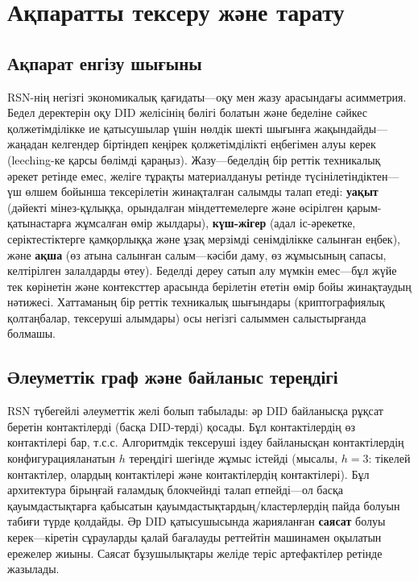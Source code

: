 \documentclass[11pt,a4paper,twocolumn]{article}
\begin{document}
\section{Ақпаратты тексеру және тарату}

\subsection{Ақпарат енгізу шығыны}

RSN-нің негізгі экономикалық қағидаты---оқу мен жазу арасындағы асимметрия. Бедел деректерін оқу DID желісінің бөлігі болатын және беделіне сәйкес қолжетімділікке ие қатысушылар үшін нөлдік шекті шығынға жақындайды---жаңадан келгендер біртіндеп кеңірек қолжетімділікті еңбегімен алуы керек (leeching-ке қарсы бөлімді қараңыз). Жазу---беделдің бір реттік техникалық әрекет ретінде емес, желіге тұрақты материалдануы ретінде түсінілетіндіктен---үш өлшем бойынша тексерілетін жинақталған салымды талап етеді: \textbf{уақыт} (дәйекті мінез-құлыққа, орындалған міндеттемелерге және өсірілген қарым-қатынастарға жұмсалған өмір жылдары), \textbf{күш-жігер} (адал іс-әрекетке, серіктестіктерге қамқорлыққа және ұзақ мерзімді сенімділікке салынған еңбек), және \textbf{ақша} (өз атына салынған салым---кәсіби даму, өз жұмысының сапасы, келтірілген залалдарды өтеу). Беделді дереу сатып алу мүмкін емес---бұл жүйе тек көрінетін және контексттер арасында берілетін ететін өмір бойы жинақтаудың нәтижесі. Хаттаманың бір реттік техникалық шығындары (криптографиялық қолтаңбалар, тексеруші алымдары) осы негізгі салыммен салыстырғанда болмашы.

\subsection{Әлеуметтік граф және байланыс тереңдігі}

RSN түбегейлі әлеуметтік желі болып табылады: әр DID байланысқа рұқсат беретін контактілерді (басқа DID-терді) қосады. Бұл контактілердің өз контактілері бар, т.с.с. Алгоритмдік тексеруші іздеу байланысқан контактілердің конфигурацияланатын $h$ тереңдігі шегінде жұмыс істейді (мысалы, $h=3$: тікелей контактілер, олардың контактілері және контактілердің контактілері). Бұл архитектура бірыңғай ғаламдық блокчейнді талап етпейді---ол басқа қауымдастықтарға қабысатын қауымдастықтардың/кластерлердің пайда болуын табиғи түрде қолдайды. Әр DID қатысушысында жарияланған \textbf{саясат} болуы керек---кіретін сұрауларды қалай бағалауды реттейтін машинамен оқылатын ережелер жиыны. Саясат бұзушылықтары желіде теріс артефактілер ретінде жазылады.
\end{document}
